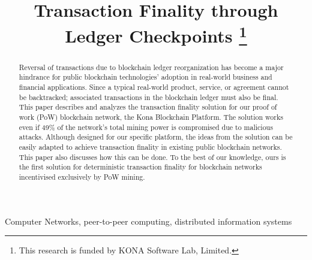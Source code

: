 \documentclass[conference]{IEEEtran}
\begin{document}
\title{Transaction Finality through Ledger Checkpoints 
	\thanks{This research is funded by KONA Software Lab, Limited.}
}

\author{
	\and		
	\and
}
\maketitle

\begin{abstract}
Reversal of transactions due to blockchain ledger reorganization has become a major hindrance for public blockchain technologies' adoption in real-world business and financial applications. Since a typical real-world product, service, or agreement cannot be backtracked; associated transactions in the blockchain ledger must also be final. This paper describes and analyzes the transaction finality solution for our proof of work (PoW) blockchain network, the Kona Blockchain Platform. The solution works even if 49\% of the network's total mining power is compromised due to malicious attacks. Although designed for our specific platform, the ideas from the solution can be easily adapted to achieve transaction finality in existing public blockchain networks. This paper also discusses how this can be done. To the best of our knowledge, ours is the first solution for deterministic transaction finality for blockchain networks incentivised exclusively by PoW mining.    
\end{abstract}

\begin{IEEEkeywords}
Computer Networks, peer-to-peer computing, distributed information systems
\end{IEEEkeywords}
\end{document}
